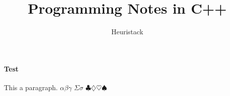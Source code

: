 \documentclass[a4paper,12pt]{report}
\title{Programming Notes in C++}
\author{Heuristack}
\begin{document}
%
%
%
%
%

\begin{center}
\end{center}

%
%

\paragraph{Test}
This a paragraph.
%
%
$\alpha\beta\gamma$
$\Sigma\sigma$
%
%
$\clubsuit \diamondsuit \heartsuit \spadesuit$

%
%

%
%

\end{document}
